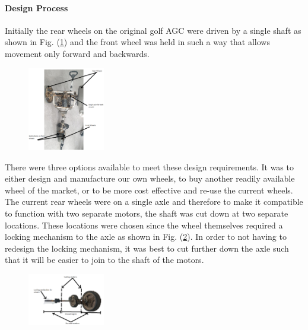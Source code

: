 \documentclass[11pt,landscape]{article}
\begin{document}
\begin{multicols}{3}
\paragraph{Design Process}
Initially the rear wheels on the original golf AGC were driven by a single
shaft as shown in Fig. (\ref{fig:prev_wheels}) and the front wheel was held in such a
way that allows movement only forward and backwards. 

\begin{figure}[H]
    \begin{center}
        \includegraphics[width=0.3\textwidth]{Prev Wheels.PNG}
        \label{fig:prev_wheels}
    \end{center}
\end{figure}


There were three options available to meet these design requirements. It was to
either design and manufacture our own wheels, to buy another readily available
wheel of the market, or to be more cost effective and re-use the current wheels.
The current rear wheels were on a single axle and therefore to make it
compatible to function with two separate motors, the shaft was cut down at two
separate locations. These locations were chosen since the wheel themselves
required a locking mechanism to the axle as shown in Fig. (\ref{fig:cut_axle}). In
order to not having to redesign the locking mechanism, it was best to cut
further down the axle such that it will be easier to join to the shaft of the
motors.

\begin{figure}[H]
    \begin{center}
        \includegraphics[width=0.3\textwidth]{Cut axle.PNG}
        \label{fig:cut_axle}
    \end{center}
\end{figure}


\end{multicols}
\end{document}
